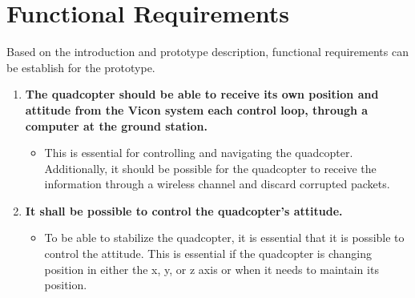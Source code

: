 \chapter{Functional Requirements}
\label{ch:functionalRequirements}
Based on the introduction and prototype description, functional requirements can be establish for the prototype.  

\begin{enumerate}[label=\textbf{\arabic*})]

\item \textbf{The quadcopter should be able to receive its own position and attitude from the Vicon system each control loop, through a computer at the ground station.}
\begin{itemize}
\item[] %
This is essential for controlling and navigating the quadcopter. Additionally, it should be possible for the quadcopter to receive the information through a wireless channel and discard corrupted packets.%
\end{itemize}



\item \textbf{It shall be possible to control the quadcopter's attitude.}
\begin{itemize}
\item[] To be able to stabilize the quadcopter, it is essential that it is possible to control the attitude. This is essential if the quadcopter is changing position in either the x, y, or z axis or when it needs to maintain its position.
\end{itemize}


\end{enumerate}
